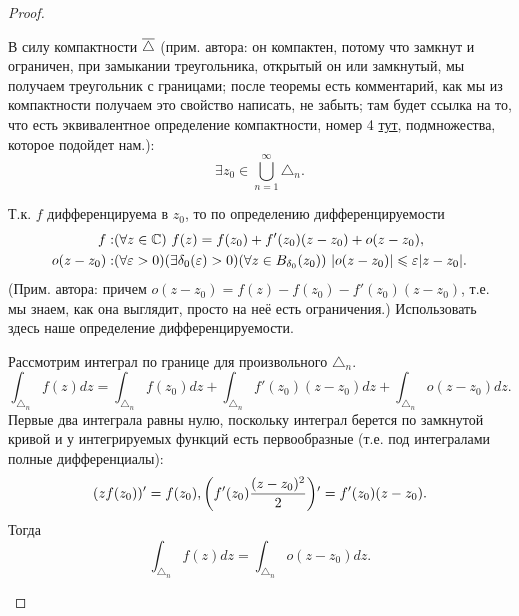 \begin{proof}
\begin{enumerate}
		В силу компактности $\overline \triangle$ (прим. автора: он компактен, потому что замкнут и ограничен, при замыкании треугольника, открытый он или замкнутый, мы получаем треугольник с границами; после теоремы есть комментарий, как мы из компактности получаем это свойство {\color{red} написать, не забыть; там будет ссылка на то, что есть эквивалентное определение компактности, номер 4 \href{https://en.wikipedia.org/wiki/Compact_space#Characterization}{тут}, подмножества, которое подойдет нам.}):
		\[
			\exists z_0 \in \bigcup_{n = 1}^\infty \triangle_n.
		\]
		
		Т.к. $f$ дифференцируема в $z_0$, то по определению дифференцируемости
		\[
			\begin{aligned}
				f: & (\forall z \in \mathbb{C}) \,\, f(z) = f(z_0) + f'(z_0) (z - z_0) + o(z - z_0), \\
				o(z - z_0) : & (\forall \varepsilon > 0) (\exists \delta_0(\varepsilon) > 0) \mathopen{}\left( \forall z \in B_{\delta_0}(z_0) \right)\mathclose{} \,\, \mathopen{}\left\lvert o(z - z_0)\right\rvert\mathclose{} \leqslant \varepsilon \mathopen{}\left\lvert z - z_0\right\rvert\mathclose{}.
			\end{aligned}
		\]
		(Прим. автора: причем $o(z - z_0) = f(z) - f(z_0) - f'(z_0) (z - z_0)$, т.е. мы знаем, как она выглядит, просто на неё есть ограничения.)
		{\color{red} Использовать здесь наше определение дифференцируемости.}
		
		Рассмотрим интеграл по границе для произвольного $\triangle_n$.
		\[
			\int_{\triangle_n} f(z) dz = \int_{\triangle_n} f(z_0) dz + \int_{\triangle_n} f'(z_0) (z - z_0) dz + \int_{\triangle_n} o(z - z_0) dz.
		\]
		Первые два интеграла равны нулю, поскольку интеграл берется по замкнутой кривой и у интегрируемых функций есть первообразные (т.е. под интегралами полные дифференциалы):
		\[
			(z f(z_0))' = f(z_0), \mathopen{}\left( f'(z_0) \frac{(z - z_0)^2}{2} \right)\mathclose{}' = f'(z_0) (z - z_0).
		\]
		Тогда
		\[
			\int_{\triangle_n} f(z) dz = \int_{\triangle_n} o(z - z_0) dz.
		\]
		

\end{enumerate}
\end{proof}
